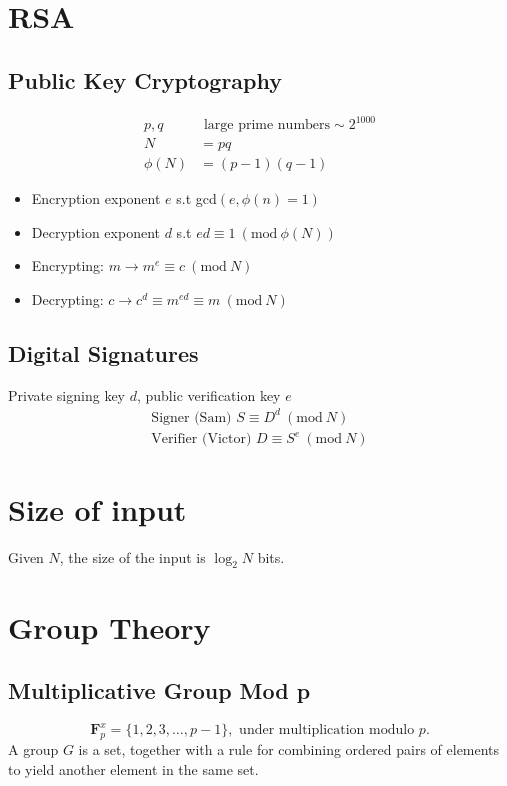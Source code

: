 \documentclass{article}
\newcommand{\Mod}[1]{\ (\mathrm{mod}\ #1)}
\begin{document}
\pagebreak
\begin{multicols}{2}
    \section*{RSA}
    \subsection*{Public Key Cryptography}
    \begin{align*}
        p, q      & \text{ large prime numbers} \sim 2^{1000} \\
        N         & = pq                                      \\
        \phi{(N)} & = (p-1)(q-1)
    \end{align*}
    \begin{itemize}
        \item Encryption exponent \(e\) s.t gcd\((e, \phi(n) =1)\)
        \item Decryption exponent \(d\) s.t \(ed \equiv 1 \Mod{\phi(N)}\)
        \item Encrypting: \(m \rightarrow m^e \equiv c \Mod{N}\)
        \item Decrypting: \(c \rightarrow c^d \equiv m^{ed} \equiv m \Mod{N}\)
    \end{itemize}

    \subsection*{Digital Signatures}
    Private signing key \(d\), public verification key \(e\)
    \begin{align*}
        \text{Signer (Sam) } S \equiv D^d \Mod{N} \\
        \text{Verifier (Victor) } D \equiv S^e \Mod{N}
    \end{align*}

    \section*{Size of input}
    Given \(N\), the size of the input is \(\log_2{N}\) bits.

    \section*{Group Theory}
    \subsection*{Multiplicative Group Mod p}
    \begin{equation*}
        \mathbf{F}_p^x = \{1, 2, 3, \ldots, p-1\}, \text{ under multiplication modulo } p.
    \end{equation*}
    A group \(G\) is a set, together with a rule for combining ordered
    pairs of elements to yield another element in the same set.


\end{multicols}
\end{document}
